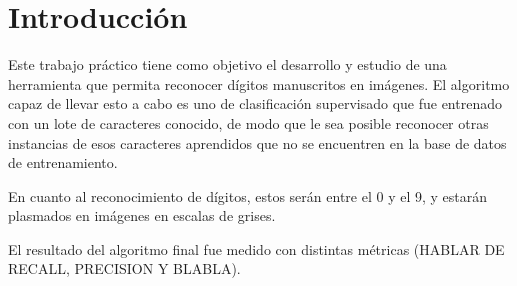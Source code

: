 \section{Introducción}

Este trabajo práctico tiene como objetivo el desarrollo y estudio de una herramienta que permita reconocer dígitos manuscritos en imágenes. El algoritmo capaz de llevar esto a cabo es uno de clasificación supervisado que fue entrenado con un lote de caracteres conocido, de modo que le sea posible reconocer otras instancias de esos caracteres aprendidos que no se encuentren en la base de datos de entrenamiento.

En cuanto al reconocimiento de dígitos, estos serán entre el 0 y el 9, y estarán plasmados en imágenes en escalas de grises.

El resultado del algoritmo final fue medido con distintas métricas (HABLAR DE RECALL, PRECISION Y BLABLA).